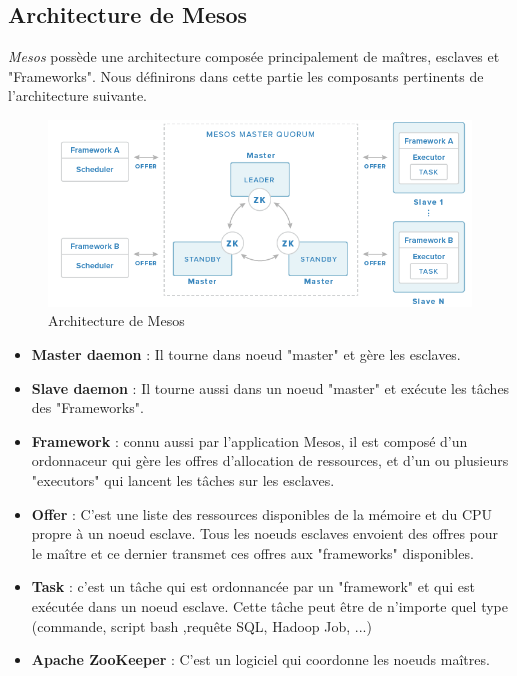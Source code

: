 \begin{onehalfspace}
\subsection{Architecture de Mesos}
\emph{Mesos} possède une architecture composée principalement de maîtres, esclaves et "Frameworks". Nous définirons dans cette partie les composants pertinents de l'architecture suivante.
\begin{figure}[H]
\centering
\includegraphics [scale=0.65]{chapitre3/assets/mesosarch.png}
\caption{Architecture de Mesos}
\end{figure}
\begin{itemize}
\item \textbf{Master daemon} : Il tourne dans noeud "master" et gère les esclaves.
\item \textbf{Slave daemon} : Il tourne aussi dans un noeud "master" et exécute les tâches des "Frameworks".
\item \textbf{Framework} : connu aussi par l'application Mesos, il est composé d'un ordonnaceur qui gère les offres d'allocation de ressources, et d'un ou plusieurs "executors" qui lancent les tâches sur les esclaves.
\item \textbf{Offer} : C'est une liste des ressources disponibles de la mémoire et du CPU propre à un noeud esclave. Tous les noeuds esclaves envoient des offres pour le maître  et ce dernier transmet ces offres aux "frameworks" disponibles.
\item  \textbf{Task} : c'est un tâche qui est ordonnancée par un "framework" et qui est exécutée dans un noeud esclave. Cette tâche peut être de n'importe quel type (commande, script bash ,requête SQL, Hadoop Job, ...)
\item \textbf{Apache ZooKeeper }: C'est un logiciel qui coordonne les noeuds maîtres.
\end{itemize}

\end{onehalfspace}
